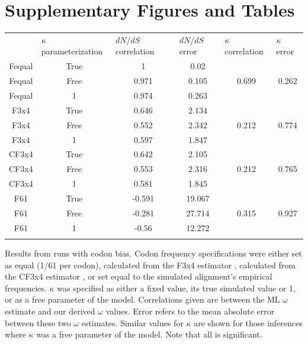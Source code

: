 \documentclass[11pt]{article}
\makeatletter
\newcommand{\customlabel}[2]{%
\protected@write \@auxout {}{\string \newlabel {#1}{{#2}{\thepage}{}{}{}}}}
\makeatother
\begin{document}
\section*{Supplementary Figures and Tables}

\begin{table}[htbp]
\customlabel{tab:tabS1}{tabS1}
\begin{tabular}{c c c c c c}
\hline\noalign{\smallskip}
\multicolumn{1}{l}{Codon frequencies} & \multicolumn{1}{l}{$\kappa$ parameterization} & \multicolumn{1}{l}{$dN/dS$ correlation} &\multicolumn{1}{l}{$dN/dS$ error} & \multicolumn{1}{l}{$\kappa$ correlation} &\multicolumn{1}{l}{$\kappa$ error} \\
\noalign{\smallskip}\hline\noalign{\smallskip}
Fequal & True & 1 & 0.02 &   &   \\ 
Fequal & Free & 0.971 & 0.105 & 0.699 & 0.262 \\ 
Fequal & 1 & 0.974 & 0.263 &   &   \\ 
\hline\noalign{\smallskip}
F3x4 & True & 0.646 & 2.134 &   &   \\ 
F3x4 & Free & 0.552 & 2.342 & 0.212 & 0.774 \\ 
F3x4 & 1 & 0.597 & 1.847 &   &   \\ 
\hline\noalign{\smallskip}
CF3x4 & True & 0.642 & 2.105 &   &   \\ 
CF3x4 & Free & 0.553 & 2.316 & 0.212 & 0.765 \\ 
CF3x4 & 1 & 0.581 & 1.845 &   &   \\ 
\hline\noalign{\smallskip}
F61 & True & -0.591 & 19.067 &   &   \\ 
F61 & Free & -0.281 & 27.714 & 0.315 & 0.927 \\ 
F61 & 1 & -0.56 & 12.272 &   &   \\ 
\noalign{\smallskip}\hline\noalign{\smallskip}
\end{tabular}
\newline
Results from runs with codon bias. Codon frequency specifications were either set as equal (1/61 per codon), calculated from the F3x4 estimator \cite{MuseGaut1994}, calculated from the CF3x4 estimator \cite{Pond2010}, or set equal to the simulated alignment's empirical frequencies. $\kappa$ was specified as either a fixed value, its true simulated value or 1, or as a free parameter of the model. Correlations given are between the ML $\omega$ estimate and our derived $\omega$ values. Error refers to the mean absolute error between these two $\omega$ estimates. Similar values for $\kappa$ are shown for those inferences where $\kappa$ was a free parameter of the model. Note that all is significant.
\end{table}	
\end{document}
